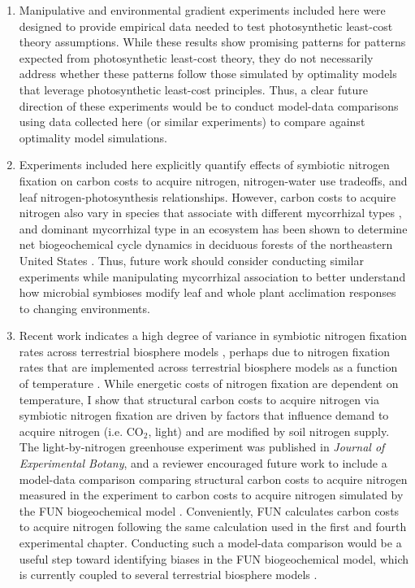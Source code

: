 \begin{enumerate}
    \item Manipulative and environmental gradient experiments included here were designed to provide empirical data needed to test photosynthetic least-cost theory assumptions. While these results show promising patterns for patterns expected from photosynthetic least-cost theory, they do not necessarily address whether these patterns follow those simulated by optimality models that leverage photosynthetic least-cost principles. Thus, a clear future direction of these experiments would be to conduct model-data comparisons using data collected here (or similar experiments) to compare against optimality model simulations.
    
    \item Experiments included here explicitly quantify effects of symbiotic nitrogen fixation on carbon costs to acquire nitrogen, nitrogen-water use tradeoffs, and leaf nitrogen-photosynthesis relationships. However, carbon costs to acquire nitrogen also vary in species that associate with different mycorrhizal types , and dominant mycorrhizal type in an ecosystem has been shown to determine net biogeochemical cycle dynamics in deciduous forests of the northeastern United States . Thus, future work should consider conducting similar experiments while manipulating mycorrhizal association to better understand how microbial symbioses modify leaf and whole plant acclimation responses to changing environments. 
    
    \item Recent work indicates a high degree of variance in symbiotic nitrogen fixation rates across terrestrial biosphere models , perhaps due to nitrogen fixation rates that are implemented across terrestrial biosphere models as a function of temperature . While energetic costs of nitrogen fixation are dependent on temperature, I show that structural carbon costs to acquire nitrogen via symbiotic nitrogen fixation are driven by factors that influence demand to acquire nitrogen (i.e. CO$_2$, light) and are modified by soil nitrogen supply. The light-by-nitrogen greenhouse experiment was published in \textit{Journal of Experimental Botany}, and a reviewer encouraged future work to include a model-data comparison comparing structural carbon costs to acquire nitrogen measured in the experiment to carbon costs to acquire nitrogen simulated by the FUN biogeochemical model . Conveniently, FUN calculates carbon costs to acquire nitrogen following the same calculation used in the first and fourth experimental chapter. Conducting such a model-data comparison would be a useful step toward identifying biases in the FUN biogeochemical model, which is currently coupled to several terrestrial biosphere models .


\end{enumerate}
